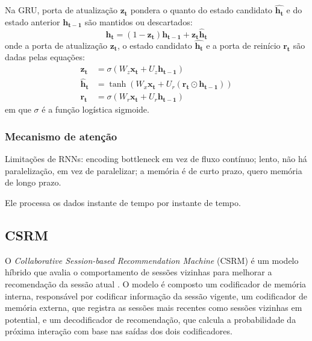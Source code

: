 Na GRU, porta de atualização $\mathbf{z_t}$ pondera o quanto do
estado candidato $\mathbf{\hat{h_t}}$ e do estado anterior $\mathbf{h_{t-1}}$
são mantidos ou descartados:
\begin{equation}
    \mathbf{h_t} = (1 - \mathbf{z_t})\mathbf{h_{t-1}} + \mathbf{z_t}\mathbf{\hat{h}_t}
\end{equation}
onde a porta de atualização $\mathbf{z_t}$, o estado candidato $\mathbf{\hat{h_t}}$
e a porta de reinício $\mathbf{r_t}$ são dadas pelas equações:
\begin{align}
    \mathbf{z_t} &= \sigma(W_z\mathbf{x_t} + U_z\mathbf{h_{t-1}}) \\
    \mathbf{\hat{h}_t} &= \tanh(W_x\mathbf{x_t} + U_r(\mathbf{r_t} \odot \mathbf{h_{t-1}})) \\
    \mathbf{r_t} &= \sigma(W_r\mathbf{x_t} + U_r\mathbf{h_{t-1}})
\end{align}
em que $\sigma$ é a função logística sigmoide.

\subsubsection{Mecanismo de atenção}

Limitações de RNNs: encoding bottleneck em vez de fluxo contínuo; lento, não há
paralelização, em vez de paralelizar; a memória é de curto prazo, quero memória
de longo prazo.

Ele processa os dados instante de tempo por instante de tempo.


\subsection{CSRM}

O \textit{Collaborative Session-based Recommendation Machine} (CSRM) é um modelo
híbrido que avalia o comportamento de sessões vizinhas para melhorar a
recomendação da sessão atual \cite{collaborative2018}. O modelo é composto um
codificador de memória interna, responsável por codificar informação da sessão
vigente, um codificador de memória externa, que registra as sessões mais
recentes como sessões vizinhas em potential, e um decodificador de recomendação,
que calcula a probabilidade da próxima interação com base nas saídas dos dois
codificadores.

